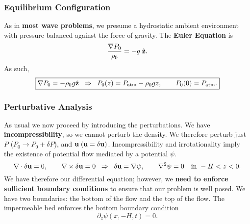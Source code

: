 \subsubsection*{Equilibrium Configuration}
As in \textbf{most wave problems}, we presume a hydrostatic ambient environment with pressure balanced against the force of gravity. The \textbf{Euler Equation} is
\[
\frac{\nabla P_0}{\rho_0} = -g\;\hat{\bf z}.
\]
As such,
\begin{equation}
\boxed{
\nabla P_0 = -\rho_0 g \hat{\bf z}
\;\;\Rightarrow\;\;
P_0(z) = P_{\rm atm} - \rho_0 g z,
\qquad P_0(0)=P_{\rm atm}.}
\end{equation}

\subsubsection{Perturbative Analysis}
As usual we now proceed by introducing the perturbations. We have \textbf{incompressibility}, so we cannot perturb the density. We therefore perturb just $P$ ($P_0 \to P_0 + \delta P$), and ${\bf u}\;({\bf u} = \delta {\bf u})$. Incompressibility and irrotationality imply the existence of potential flow mediated by a potential $\psi$.
\begin{equation}
\nabla\cdot \delta{\bf u}=0,
\qquad
\nabla\times \delta{\bf u}=0
\;\;\Rightarrow\;\;
\delta{\bf u}=\nabla \psi,
\qquad
\nabla^2 \psi = 0
\quad \text{in } -H<z<0.
\label{eq:Laplace}
\end{equation}
We have therefore our differential equation; however, we \textbf{need to enforce sufficient boundary conditions} to ensure that our problem is well posed. We have two boundaries: the bottom of the flow and the top of the flow. The impermeable bed enforces the bottom boundary condition
\begin{equation}
\partial_z \psi(x,-H,t)=0.
\label{eq:bottomBC}
\end{equation}


